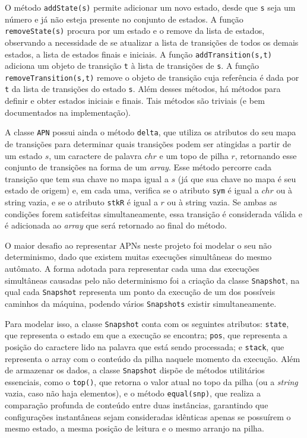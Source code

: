 O método \texttt{addState(s)} permite adicionar um novo estado, desde que \texttt{s} seja um número e já não esteja presente no conjunto de estados. A função \texttt{removeState(s)} procura por um estado e o remove da lista de estados, observando a necessidade de se atualizar a lista de transições de todos os demais estados, a lista de estados finais e iniciais. A função \texttt{addTransition(s,t)} adiciona um objeto de transição \texttt{t} à lista de transições de \texttt{s}. A função \texttt{removeTransition(s,t)} remove o objeto de transição cuja referência é dada por \texttt{t} da lista de transições do estado \texttt{s}. Além desses métodos, há métodos para definir e obter estados iniciais e finais. Tais métodos são triviais (e bem documentados na implementação).

A classe \texttt{APN} possui ainda o método \texttt{delta}, que utiliza os atributos do seu mapa de transições para determinar quais transições podem ser atingidas a partir de um estado $s$, um caractere de palavra $chr$ e um topo de pilha $r$, retornando esse conjunto de transições na forma de um \emph{array}. Esse método percorre cada transição que tem sua chave no mapa igual a $s$ (já que sua chave no mapa é seu estado de origem) e, em cada uma, verifica se o atributo \texttt{sym} é igual a $chr$ ou à string vazia, e se o atributo \texttt{stkR} é igual a $r$ ou à string vazia. Se ambas as condições forem satisfeitas simultaneamente, essa transição é considerada válida e é adicionada ao \emph{array} que será retornado ao final do método.

O maior desafio ao representar APNs neste projeto foi modelar o seu não determinismo, dado que existem muitas execuções simultâneas do mesmo autômato. A forma adotada para representar cada uma das execuções simultâneas causadas pelo não determinismo foi a criação da classe \texttt{Snapshot}, na qual cada \texttt{Snapshot} representa um ponto da execução de um dos possíveis caminhos da máquina, podendo vários \texttt{Snapshots} existir simultaneamente.

Para modelar isso, a classe \texttt{Snapshot} conta com os seguintes atributos: \texttt{state}, que representa o estado em que a execução se encontra; \texttt{pos}, que representa a posição do caractere lido na palavra que está sendo processada; e \texttt{stack}, que representa o array com o conteúdo da pilha naquele momento da execução. Além de armazenar os dados, a classe \texttt{Snapshot} dispõe de métodos utilitários essenciais, como o \texttt{top()}, que retorna o valor atual no topo da pilha (ou a \emph{string} vazia, caso não haja elementos), e o método \texttt{equal(snp)}, que realiza a comparação profunda de conteúdo entre duas instâncias, garantindo que configurações instantâneas sejam consideradas idênticas apenas se possuírem o mesmo estado, a mesma posição de leitura e o mesmo arranjo na pilha.

